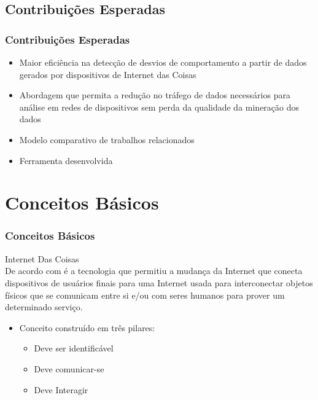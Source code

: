 \documentclass[hyperref={pdfpagelabels=false}]{beamer}
\begin{document}
\subsection{Contribuições Esperadas}  

\begin{frame}
	\frametitle{Contribuições Esperadas}
	\begin{itemize}
		\item Maior eficiência na detecção de desvios de comportamento a partir de dados gerados por dispositivos de Internet das Coisas
        \item Abordagem que permita a redução no tráfego de dados necessários para análise em redes de dispositivos sem perda da qualidade da mineração dos dados 
        \item Modelo comparativo de trabalhos relacionados
        \item Ferramenta desenvolvida 
	\end{itemize}
\end{frame}
   
\section{Conceitos Básicos}

\begin{frame}
	\frametitle{Conceitos Básicos}
    
    \Large{Internet Das Coisas} \\
    
    \normalsize{De acordo com \cite{000-004}} é a tecnologia que permitiu a mudança da Internet que conecta dispositivos de usuários finais para uma Internet usada para interconectar objetos físicos que se comunicam entre si e/ou com seres humanos para prover um determinado serviço.
    \begin{itemize}
	    \item \normalsize{Conceito construído em três pilares:} \begin{itemize}
		    \item Deve ser identificável
            \item Deve comunicar-se
            \item Deve Interagir
		    \end{itemize}
        
    \end{itemize}

\end{frame}
\end{document}
